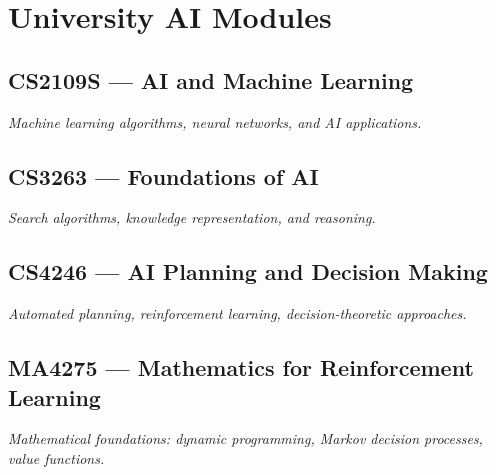 
\section{University AI Modules}

\subsection{CS2109S — AI and Machine Learning}
\textit{Machine learning algorithms, neural networks, and AI applications.}


\subsection{CS3263 — Foundations of AI}
\textit{Search algorithms, knowledge representation, and reasoning.}


\subsection{CS4246 — AI Planning and Decision Making}
\textit{Automated planning, reinforcement learning, decision-theoretic approaches.}


\subsection{MA4275 — Mathematics for Reinforcement Learning}
\textit{Mathematical foundations: dynamic programming, Markov decision processes, value functions.}

